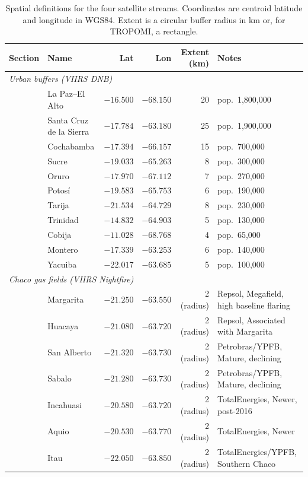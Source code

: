 \begin{table}[H]
\centering\small
\caption{Spatial definitions for the four satellite streams. Coordinates are centroid latitude and longitude in WGS84. Extent is a circular buffer radius in km or, for TROPOMI, a rectangle.}
\label{tab:spatial}
\begin{tabular}{llrrrl}
\toprule
Section & Name & Lat & Lon & Extent (km) & Notes \\
\midrule
\multicolumn{6}{l}{\textit{Urban buffers (VIIRS DNB)}} \\
& La Paz–El Alto & $-16.500$ & $-68.150$ & 20 & pop.\ 1,800,000 \\
& Santa Cruz de la Sierra & $-17.784$ & $-63.180$ & 25 & pop.\ 1,900,000 \\
& Cochabamba & $-17.394$ & $-66.157$ & 15 & pop.\ 700,000 \\
& Sucre & $-19.033$ & $-65.263$ & 8 & pop.\ 300,000 \\
& Oruro & $-17.970$ & $-67.112$ & 7 & pop.\ 270,000 \\
& Potosí & $-19.583$ & $-65.753$ & 6 & pop.\ 190,000 \\
& Tarija & $-21.534$ & $-64.729$ & 8 & pop.\ 230,000 \\
& Trinidad & $-14.832$ & $-64.903$ & 5 & pop.\ 130,000 \\
& Cobija & $-11.028$ & $-68.768$ & 4 & pop.\ 65,000 \\
& Montero & $-17.339$ & $-63.253$ & 6 & pop.\ 140,000 \\
& Yacuiba & $-22.017$ & $-63.685$ & 5 & pop.\ 100,000 \\
\midrule
\multicolumn{6}{l}{\textit{Chaco gas fields (VIIRS Nightfire)}} \\
& Margarita & $-21.250$ & $-63.550$ & 2 (radius) & Repsol, Megafield, high baseline flaring \\
& Huacaya & $-21.080$ & $-63.720$ & 2 (radius) & Repsol, Associated with Margarita \\
& San Alberto & $-21.320$ & $-63.730$ & 2 (radius) & Petrobras/YPFB, Mature, declining \\
& Sabalo & $-21.280$ & $-63.730$ & 2 (radius) & Petrobras/YPFB, Mature, declining \\
& Incahuasi & $-20.580$ & $-63.720$ & 2 (radius) & TotalEnergies, Newer, post-2016 \\
& Aquio & $-20.530$ & $-63.770$ & 2 (radius) & TotalEnergies, Newer \\
& Itau & $-22.050$ & $-63.850$ & 2 (radius) & TotalEnergies/YPFB, Southern Chaco \\

\end{tabular}
\end{table}
